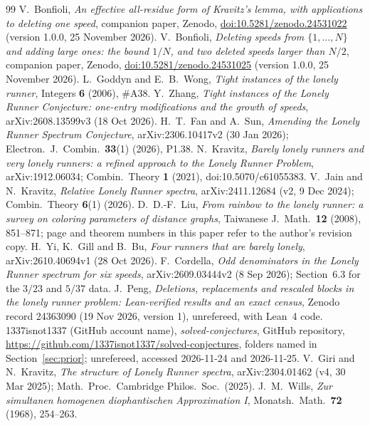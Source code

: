 \documentclass[11pt]{article}
\theoremstyle{definition}
\theoremstyle{remark}
\begin{document}
\begin{thebibliography}{99}
 V.~Bonfioli, \emph{An effective all-residue form of Kravitz's lemma, with applications to deleting one speed}, companion paper, Zenodo, \href{https://doi.org/10.5281/zenodo.24531022}{doi:10.5281/zenodo.24531022} (version 1.0.0, 25 November 2026).
 V.~Bonfioli, \emph{Deleting speeds from $\{1,\dots,N\}$ and adding large ones: the bound $1/N$, and two deleted speeds larger than $N/2$}, companion paper, Zenodo, \href{https://doi.org/10.5281/zenodo.24531025}{doi:10.5281/zenodo.24531025} (version 1.0.0, 25 November 2026).
 L.~Goddyn and E.~B.~Wong, \emph{Tight instances of the lonely runner}, Integers \textbf{6} (2006), \#A38.
 Y.~Zhang, \emph{Tight instances of the Lonely Runner Conjecture: one-entry modifications and the growth of speeds}, arXiv:2608.13599v3 (18 Oct 2026).
 H.~T.~Fan and A.~Sun, \emph{Amending the Lonely Runner Spectrum Conjecture}, arXiv:2306.10417v2 (30 Jan 2026); Electron.\ J.\ Combin.\ \textbf{33}(1) (2026), P1.38.
 N.~Kravitz, \emph{Barely lonely runners and very lonely runners: a refined approach to the Lonely Runner Problem}, arXiv:1912.06034; Combin.\ Theory \textbf{1} (2021), doi:10.5070/c61055383.
 V.~Jain and N.~Kravitz, \emph{Relative Lonely Runner spectra}, arXiv:2411.12684 (v2, 9 Dec 2024); Combin.\ Theory \textbf{6}(1) (2026).
 D.~D.-F.~Liu, \emph{From rainbow to the lonely runner: a survey on coloring parameters of distance graphs}, Taiwanese J.\ Math.\ \textbf{12} (2008), 851--871; page and theorem numbers in this paper refer to the author's revision copy.
 H.~Yi, K.~Gill and B.~Bu, \emph{Four runners that are barely lonely}, arXiv:2610.40694v1 (28 Oct 2026).
 F.~Cordella, \emph{Odd denominators in the Lonely Runner spectrum for six speeds}, arXiv:2609.03444v2 (8 Sep 2026); Section~6.3 for the $3/23$ and $5/37$ data.
 J.~Peng, \emph{Deletions, replacements and rescaled blocks in the lonely runner problem: Lean-verified results and an exact census}, Zenodo record 24363090 (19 Nov 2026, version 1), unrefereed, with Lean~4 code.
 1337isnot1337 (GitHub account name), \emph{solved-conjectures}, GitHub repository, \url{https://github.com/1337isnot1337/solved-conjectures}, folders named in Section~\ref{sec:prior}; unrefereed, accessed 2026-11-24 and 2026-11-25.
 V.~Giri and N.~Kravitz, \emph{The structure of Lonely Runner spectra}, arXiv:2304.01462 (v4, 30 Mar 2025); Math.\ Proc.\ Cambridge Philos.\ Soc.\ (2025).
 J.~M.~Wills, \emph{Zur simultanen homogenen diophantischen Approximation I}, Monatsh.\ Math.\ \textbf{72} (1968), 254--263.
\end{thebibliography}
\end{document}
